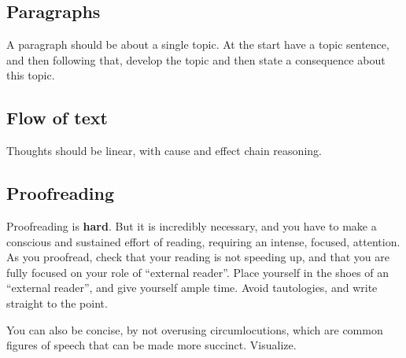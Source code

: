\documentclass[10pt, oneside]{article}
\begin{document}
\subsection{Paragraphs}
A paragraph should be about a single topic. At the start have a topic sentence, and then following that, develop the topic and then state a consequence about this topic. 
\subsection{Flow of text}
Thoughts should be linear, with cause and effect chain reasoning. 
\subsection{Proofreading}
Proofreading is \textbf{hard}. But it is incredibly necessary, and you have to make a conscious and sustained effort of reading, requiring an intense, focused, attention. As you proofread, check that your reading is not speeding up, and that you are fully focused on your role of ``external reader''. Place yourself in the shoes of an ``external reader'', and give yourself ample time.
Avoid tautologies, and write straight to the point. 

You can also be concise, by not overusing circumlocutions, which are common figures of speech that can be made more succinct. Visualize. 
\end{document}
